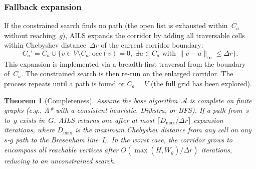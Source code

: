 \documentclass[journal]{IEEEtran}
\newtheorem{theorem}{Theorem}
\begin{document}
\subsubsection{Fallback expansion}

If the constrained search finds no path (the open list is exhausted within~$C_a$ without reaching~$g$), AILS expands the corridor by adding all traversable cells within Chebyshev distance~$\Delta r$ of the current corridor boundary:
\begin{equation}
    C_a' = C_a \cup \{v \in V \setminus C_a : \mathrm{occ}(v)=0,\;
           \exists u \in C_a \text{ with } \|v - u\|_{\infty} \leq \Delta r\}.
\end{equation}
This expansion is implemented via a breadth-first traversal from the boundary of~$C_a$.
The constrained search is then re-run on the enlarged corridor.
The process repeats until a path is found or $C_a = V$ (the full grid has been explored).

\begin{theorem}[Completeness]\label{thm:completeness}
Assume the base algorithm~$\mathcal{A}$ is complete on finite graphs (e.g., A* with a consistent heuristic, Dijkstra, or BFS).
If a path from~$s$ to~$g$ exists in~$G$, AILS returns one after at most $\lceil D_{\max}/\Delta r \rceil$ expansion iterations, where $D_{\max}$ is the maximum Chebyshev distance from any cell on \emph{any} $s$-$g$ path to the Bresenham line~$L$.
In the worst case, the corridor grows to encompass all reachable vertices after $O(\max(H, W_g) / \Delta r)$ iterations, reducing to an unconstrained search.
\end{theorem}
\end{document}
